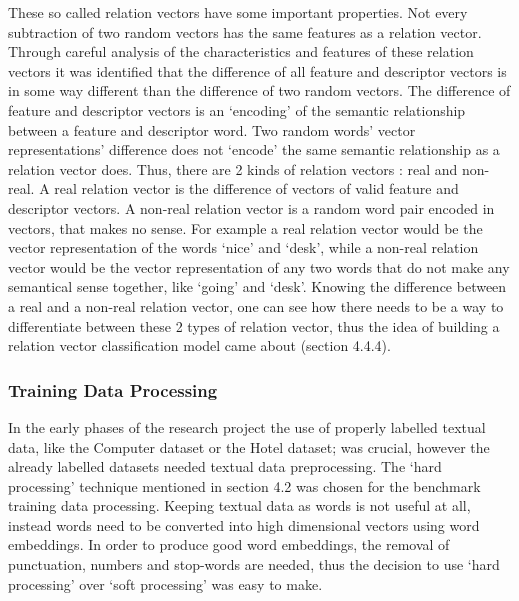 \documentclass{sig-alternate}
\begin{document}
These so called relation vectors have some important properties. Not every subtraction of two random vectors has the same features as a relation vector. Through careful analysis of the characteristics and features of these relation vectors it was identified that the difference of all feature and descriptor vectors is in some way different than the difference of two random vectors. The difference of feature and descriptor vectors is an `encoding' of the semantic relationship between a feature and descriptor word. Two random words' vector  representations' difference does not `encode' the same semantic relationship as a relation vector does. Thus, there are 2 kinds of relation vectors : real and non-real. A real relation vector is the difference of vectors of valid feature and descriptor vectors. A non-real relation vector is a random word pair encoded in vectors, that makes no sense. For example a real relation vector would be the vector representation of the words `nice' and `desk', while a non-real relation vector would be the vector representation of any two words that do not make any semantical sense together, like `going' and `desk'. Knowing the difference between a real and a non-real relation vector, one can see how there needs to be a way to differentiate between these 2 types of relation vector, thus the idea of building a relation vector classification model came about (section 4.4.4).

\subsubsection{Training Data Processing}
In the early phases of the research project the use of properly labelled textual data, like the Computer dataset\cite{HuLiu2004} or the Hotel dataset\cite{WangLuZhai2010};\cite{WangLuZhai2011} was crucial, however the already labelled datasets needed textual data preprocessing. The `hard processing' technique mentioned in section 4.2 was chosen for the benchmark training data processing. Keeping textual data as words is not useful at all, instead words need to be converted into high dimensional vectors using word embeddings. In order to produce good word embeddings, the removal of punctuation, numbers and stop-words are needed, thus the decision to use `hard processing' over `soft processing' was easy to make.
\end{document}
